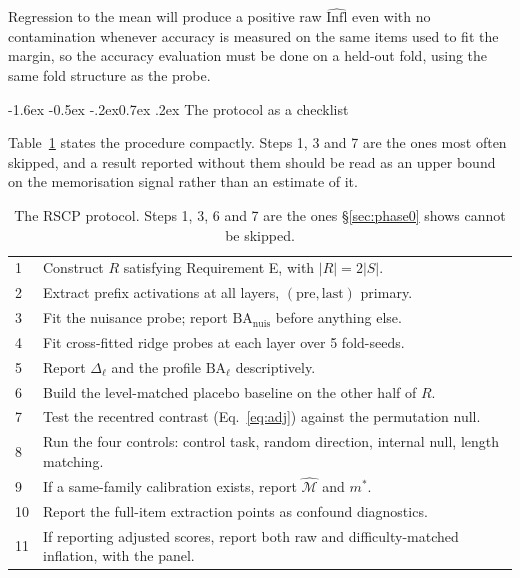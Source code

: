 \documentclass[10pt,twocolumn,letterpaper]{article}
\makeatletter
\renewcommand\subsection{\@startsection{subsection}{2}{\z@}%
  {-1.6ex \@plus -0.5ex \@minus -.2ex}{0.7ex \@plus .2ex}%
  {\normalfont\normalsize\bfseries}}
\newcommand{\BA}{\mathrm{BA}}
\newcommand{\nuis}{\mathrm{nuis}}
\makeatother
\begin{document}
Regression to the mean will produce a positive raw $\widehat{\mathrm{Infl}}$ even with no contamination whenever accuracy is measured on the same items used to fit the margin, so the accuracy evaluation must be done on a held-out fold, using the same fold structure as the probe.

\subsection{The protocol as a checklist}

Table~\ref{tab:checklist} states the procedure compactly. Steps 1, 3 and 7 are the ones most often skipped, and a result reported without them should be read as an upper bound on the memorisation signal rather than an estimate of it.

\begin{table}[t]
\small
\begin{tabular}{@{}p{}p{}@{}}
\toprule
1 & Construct $R$ satisfying Requirement E, with $|R| = 2|S|$. \\
2 & Extract prefix activations at all layers, $(\mathrm{pre},\mathrm{last})$ primary. \\
3 & Fit the nuisance probe; report $\BA_{\nuis}$ before anything else. \\
4 & Fit cross-fitted ridge probes at each layer over 5 fold-seeds. \\
5 & Report $\Delta_\ell$ and the profile $\BA_\ell$ descriptively. \\
6 & Build the level-matched placebo baseline on the other half of $R$. \\
7 & Test the recentred contrast (Eq.~\ref{eq:adj}) against the permutation null. \\
8 & Run the four controls: control task, random direction, internal null, length matching. \\
9 & If a same-family calibration exists, report $\widehat{\mathcal{M}}$ and $m^{*}$. \\
10 & Report the full-item extraction points as confound diagnostics. \\
11 & If reporting adjusted scores, report both raw and difficulty-matched inflation, with the panel. \\
\bottomrule
\end{tabular}
\caption{The RSCP protocol. Steps 1, 3, 6 and 7 are the ones \S\ref{sec:phase0} shows cannot be skipped.}
\label{tab:checklist}
\end{table}
\end{document}
